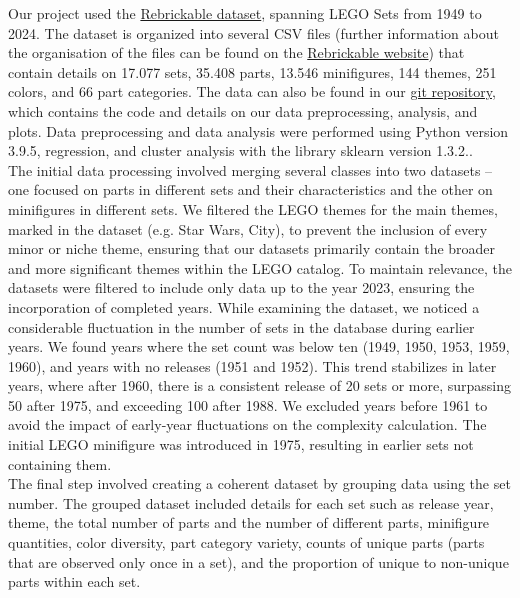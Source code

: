 \documentclass{article}
\theoremstyle{plain}
\theoremstyle{definition}
\theoremstyle{remark}
\newcommand*{\quelle}{
  \footnotesize Imagesource: Inverted image from\\
}
\begin{document}
Our project used the \href{https://rebrickable.com/downloads/}{Rebrickable dataset}, spanning LEGO Sets from 1949 to 2024. The dataset is organized into several CSV files (further information about the organisation of the files can be found on the \href{https://rebrickable.com/downloads/}{Rebrickable website}) that contain details on 17.077 sets, 35.408 parts, 13.546 minifigures, 144 themes, 251 colors, and 66 part categories. The data can also be found in our \href{https://github.com/eddiebeach99/Data_Literacy/tree/main}{git repository}, which contains the code and details on our data preprocessing, analysis, and plots. Data preprocessing and data analysis were performed using Python version 3.9.5, regression, and cluster analysis with the library sklearn version 1.3.2..\\
The initial data processing involved merging several classes into two datasets – one focused on parts in different sets and their characteristics and the other on minifigures in different sets. We filtered the LEGO themes for the main themes, marked in the dataset (e.g. Star Wars, City), to prevent the inclusion of every minor or niche theme, ensuring that our datasets primarily contain the broader and more significant themes within the LEGO catalog. To maintain relevance, the datasets were filtered to include only data up to the year 2023, ensuring the incorporation of completed years. While examining the dataset, we noticed a considerable fluctuation in the number of sets in the database during earlier years. We found years where the set count was below ten (1949, 1950, 1953, 1959, 1960), and years with no releases (1951 and 1952). This trend stabilizes in later years, where after 1960, there is a consistent release of 20 sets or more, surpassing 50 after 1975, and exceeding 100 after 1988. We excluded years before 1961 to avoid the impact of early-year fluctuations on the complexity calculation. The initial LEGO minifigure was introduced in 1975, resulting in earlier sets not containing them.\\
The final step involved creating a coherent dataset by grouping data using the set number. The grouped dataset included details for each set such as release year, theme, the total number of parts and the number of different parts, minifigure quantities, color diversity, part category variety, counts of unique parts (parts that are observed only once in a set), and the proportion of unique to non-unique parts within each set.\\
\end{document}

